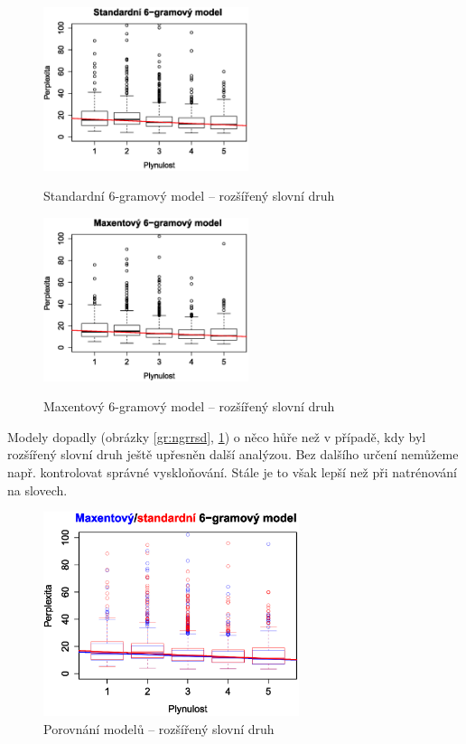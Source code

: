 \documentclass[12pt,a4paper]{report}
\begin{document}
\begin{figure}[!htb]
\begin{center}
  \centering\includegraphics[width=60mm]{./grafy/morf/ngram/rsd.svg.eps}
  \caption{Standardní 6-gramový model -- rozšířený slovní druh}\label{gr:ngrrsd}
\endminipage\quad
{}
  \centering\includegraphics[width=60mm]{./grafy/morf/maxent/rsd.svg.eps}
  \caption{Maxentový 6-gramový model -- rozšířený slovní druh}\label{gr:maxrsd}
\endminipage
\end{center}
\end{figure}


Modely dopadly (obrázky \ref{gr:ngrrsd}, \ref{gr:maxrsd}) o něco hůře než v případě, kdy byl rozšířený slovní druh ještě upřesněn další analýzou. Bez dalšího určení nemůžeme např. kontrolovat správné vyskloňování. Stále je to však lepší než při natrénování na slovech.



\pagebreak


\begin{figure}[!htbp]
\begin{center}
	\centering
	\includegraphics[width=75mm]{./grafy/morf/porovnani/rsd.svg.eps}	
	\caption{Porovnání modelů -- rozšířený slovní druh}\label{gr:porrsd}
\endminipage
\end{center}
\end{figure}
\end{document}
